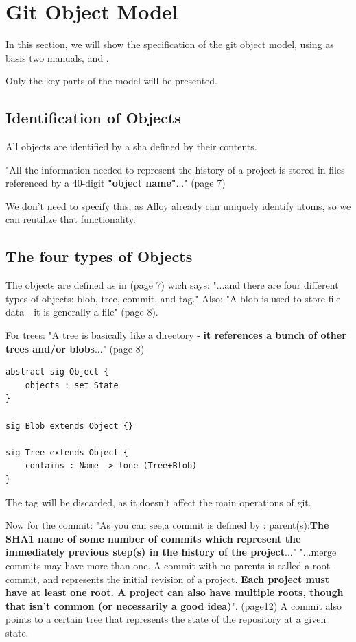 \section{Git Object Model}

In this section, we will show the 
specification of the git object model, using as
basis two manuals, \cite{gitComm} and \cite{progit}. \par
Only the key parts of the model will be presented. \par

\subsection{Identification of Objects}

All objects are identified by a sha defined by their contents. \par
"All the information needed to represent the history
of a project is stored in files referenced by a 
40-digit {\bf "object name"}..." (page 7) \par
We don't need to specify this, as Alloy already can uniquely
identify atoms, so we can reutilize that functionality. \par


\subsection{The four types of Objects}

The objects are defined as in \cite{gitComm} (page 7) wich says: 
"...and there are four different types of objects: blob,
tree, commit, and tag."
Also: "A blob is used to store file data - it is generally a file" 
\cite{gitComm} (page 8). \par
For trees: "A tree is basically like a directory 
- {\bf it references a bunch
of other trees and/or blobs}..." (page 8) \par 

\begin{lstlisting}
abstract sig Object {
	objects : set State
}

sig Blob extends Object {}

sig Tree extends Object {
	contains : Name -> lone (Tree+Blob)
}
\end{lstlisting}

The tag will be discarded, as it doesn't affect the main operations
of git. \par 

Now for the commit:  
"As you can see,a commit is defined by : 
parent(s):{\bf The SHA1 name of some number of commits which
represent the immediately previous step(s) in the 
history of the project}..."
"...merge commits may have more than one. A commit with no 
parents is called a root commit, and represents the 
initial revision of a project. {\bf Each project must have at
least one root. A project can also have multiple roots,
though that isn't common (or necessarily a good idea)}". 
\cite{gitComm} (page12) 
A commit also points to a certain tree that represents the state of the
repository at a given state. \par

